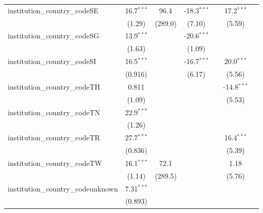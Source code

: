 \begin{tabular}{lcccccc}
   institution\_country\_codeSE          & 16.7$^{***}$  & 96.4         & -18.3$^{***}$ &               & 17.2$^{***}$  &   \\   
                                         & (1.29)        & (289.0)      & (7.10)        &               & (5.59)        &   \\   
   institution\_country\_codeSG          & 13.9$^{***}$  &              & -20.6$^{***}$ &               &               &   \\   
                                         & (1.63)        &              & (1.09)        &               &               &   \\   
   institution\_country\_codeSI          & 16.5$^{***}$  &              & -16.7$^{***}$ &               & 20.0$^{***}$  &   \\   
                                         & (0.916)       &              & (6.17)        &               & (5.56)        &   \\   
   institution\_country\_codeTH          & 0.811         &              &               &               & -14.8$^{***}$ &   \\   
                                         & (1.09)        &              &               &               & (5.53)        &   \\   
   institution\_country\_codeTN          & 22.9$^{***}$  &              &               &               &               &   \\   
                                         & (1.26)        &              &               &               &               &   \\   
   institution\_country\_codeTR          & 27.7$^{***}$  &              &               &               & 16.4$^{***}$  &   \\   
                                         & (0.836)       &              &               &               & (5.39)        &   \\   
   institution\_country\_codeTW          & 16.1$^{***}$  & 72.1         &               &               & 1.18          &   \\   
                                         & (1.14)        & (289.5)      &               &               & (5.76)        &   \\   
   institution\_country\_codeunknown     & 7.31$^{***}$  &              &               &               &               &   \\   
                                         & (0.893)       &              &               &               &               &   \\   

\end{tabular}
